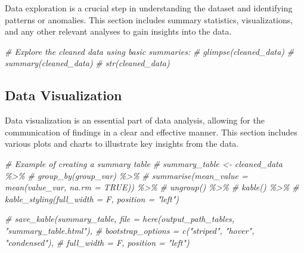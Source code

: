 \documentclass[
  12pt,
]{article}
\newenvironment{Shaded}{\begin{snugshade}}{\end{snugshade}}
\newcommand{\CommentTok}[1]{\textcolor[rgb]{0.56,0.35,0.01}{\textit{#1}}}
\begin{document}
Data exploration is a crucial step in understanding the dataset and
identifying patterns or anomalies. This section includes summary
statistics, visualizations, and any other relevant analyses to gain
insights into the data.

\begin{Shaded}
\begin{Highlighting}[]
\CommentTok{\# Explore the cleaned data using basic summaries:}
\CommentTok{\# glimpse(cleaned\_data)}
\CommentTok{\# summary(cleaned\_data)}
\CommentTok{\# str(cleaned\_data)}
\end{Highlighting}
\end{Shaded}

\subsection{Data Visualization}\label{data-visualization}

Data visualization is an essential part of data analysis, allowing for
the communication of findings in a clear and effective manner. This
section includes various plots and charts to illustrate key insights
from the data.

\begin{Shaded}
\begin{Highlighting}[]
\CommentTok{\# Example of creating a summary table }
\CommentTok{\# summary\_table \textless{}{-} cleaned\_data \%\textgreater{}\%}
\CommentTok{\#   group\_by(group\_var) \%\textgreater{}\%}
\CommentTok{\#   summarise(mean\_value = mean(value\_var, na.rm = TRUE)) \%\textgreater{}\%}
\CommentTok{\#   ungroup() \%\textgreater{}\%}
\CommentTok{\#   kable() \%\textgreater{}\%}
\CommentTok{\#   kable\_styling(full\_width = F, position = "left") }

\CommentTok{\# save\_kable(summary\_table, file = here(output\_path\_tables, "summary\_table.html"),}
\CommentTok{\#   bootstrap\_options = c("striped", "hover", "condensed"),}
\CommentTok{\#   full\_width = F, position = "left")}
\end{Highlighting}
\end{Shaded}
\end{document}
